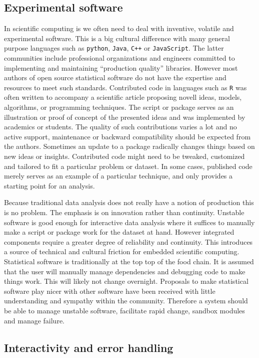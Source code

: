\subsection{Experimental software}

In scientific computing is we often need to deal with inventive, volatile and experimental  software. This is a big cultural difference with many general purpose languages such as \texttt{python}, \texttt{Java}, \texttt{C++} or \texttt{JavaScript}. The latter communities include professional organizations and engineers committed to implementing and maintaining ``production quality'' libraries. However most authors of open source statistical software do not have the expertise and resources to meet such standards. Contributed code in languages such as \texttt{R} was often written to accompany a scientific article proposing novell ideas, models, algorithms, or programming techniques. The script or package serves as an illustration or proof of concept of the presented ideas and was implemented by academics or students. The quality of such contributions varies a lot and no active support, maintenance or backward compatibility should be expected from the authors. Sometimes an update to a package radically changes things based on new ideas or insights. Contributed code might need to be tweaked, customized and tailored to fit a particular problem or dataset. In some cases, published code merely serves as an example of a particular technique, and only provides a starting point for an analysis. 

Because traditional data analysis does not really have a notion of production this is no problem. The emphasis is on innovation rather than continuity. Unstable software is good enough for interactive data analysis where it suffices to manually make a script or package work for the dataset at hand. However integrated components require a greater degree of reliability and continuity. This introduces a source of technical and cultural friction for embedded scientific computing. Statistical software is traditionally at the top top of the food chain. It is assumed that the user will manually manage dependencies and debugging code to make things work. This will likely not change overnight. Proposals to make statistical software play nicer with other software have been received with little understanding and sympathy within the community. Therefore a system should be able to manage unstable software, facilitate rapid change, sandbox modules and manage failure.

\subsection{Interactivity and error handling}

